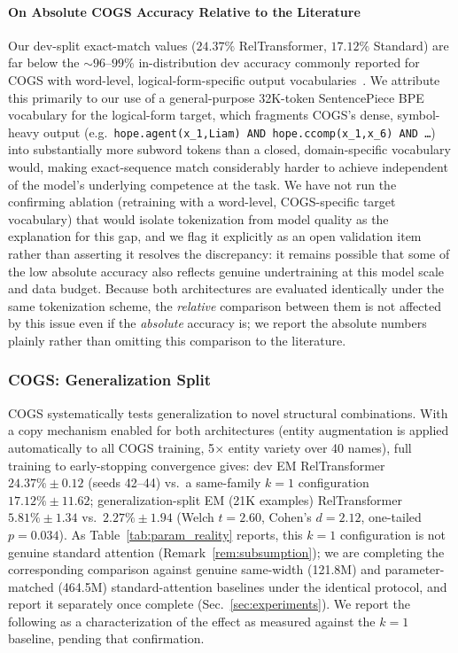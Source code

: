 \documentclass[review]{elsarticle}
\begin{document}
\paragraph{On Absolute COGS Accuracy Relative to the Literature}
Our dev-split exact-match values ($24.37\%$ RelTransformer, $17.12\%$ Standard) are far below the ${\sim}96$--$99\%$ in-distribution dev accuracy commonly reported for COGS with word-level, logical-form-specific output vocabularies~\cite{kim2020cogs}. We attribute this primarily to our use of a general-purpose 32K-token SentencePiece BPE vocabulary for the logical-form target, which fragments COGS's dense, symbol-heavy output (e.g.\ \texttt{hope.agent(x\_1,Liam) AND hope.ccomp(x\_1,x\_6) AND \ldots}) into substantially more subword tokens than a closed, domain-specific vocabulary would, making exact-sequence match considerably harder to achieve independent of the model's underlying competence at the task. We have not run the confirming ablation (retraining with a word-level, COGS-specific target vocabulary) that would isolate tokenization from model quality as the explanation for this gap, and we flag it explicitly as an open validation item rather than asserting it resolves the discrepancy: it remains possible that some of the low absolute accuracy also reflects genuine undertraining at this model scale and data budget. Because both architectures are evaluated identically under the same tokenization scheme, the \emph{relative} comparison between them is not affected by this issue even if the \emph{absolute} accuracy is; we report the absolute numbers plainly rather than omitting this comparison to the literature.

\subsubsection{COGS: Generalization Split}
\label{sec:cogs-results}
COGS systematically tests generalization to novel structural combinations. With a copy mechanism enabled for both architectures (entity augmentation is applied automatically to all COGS training, 5$\times$ entity variety over 40 names), full training to early-stopping convergence gives: dev EM RelTransformer $24.37\%{\pm}0.12$ (seeds 42--44) vs.\ a same-family $k{=}1$ configuration $17.12\%{\pm}11.62$; generalization-split EM (21K examples) RelTransformer $5.81\%{\pm}1.34$ vs.\ $2.27\%{\pm}1.94$ (Welch $t{=}2.60$, Cohen's $d{=}2.12$, one-tailed $p{=}0.034$). As Table~\ref{tab:param_reality} reports, this $k{=}1$ configuration is not genuine standard attention (Remark~\ref{rem:subsumption}); we are completing the corresponding comparison against genuine same-width (121.8M) and parameter-matched (464.5M) standard-attention baselines under the identical protocol, and report it separately once complete (Sec.~\ref{sec:experiments}). We report the following as a characterization of the effect as measured against the $k{=}1$ baseline, pending that confirmation.
\end{document}
